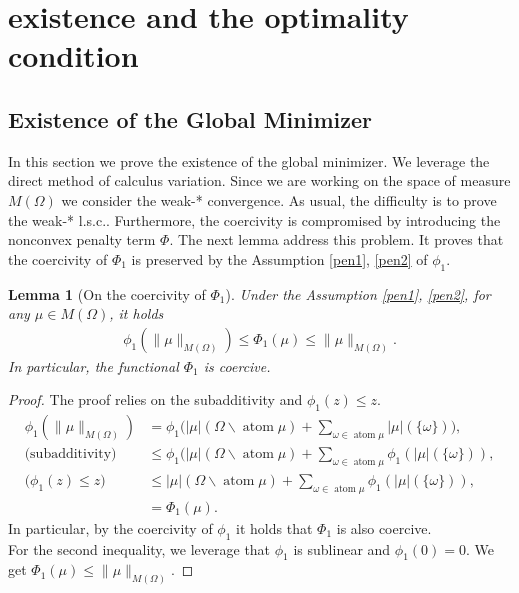 \documentclass[12pt,fleqn]{amsart}
\newtheorem{lemma}[theorem]{Lemma}
\theoremstyle{definition}
\DeclareMathOperator*{\atom}{atom}
\begin{document}
\section{existence and the optimality condition}
\subsection{Existence of the Global Minimizer}
In this section we prove the existence of the global minimizer. 
We leverage the direct method of calculus variation. 
Since we are working on the space of measure $M(\Omega)$ we consider the weak-* convergence. 
As usual, the difficulty is to prove the weak-* l.s.c.. 
Furthermore, the coercivity is compromised by introducing the nonconvex penalty term $\Phi$. 
The next lemma address this problem. 
It proves that the coercivity of $\Phi_1$ is preserved by the Assumption \ref{pen1}, \ref{pen2} of $\phi_1$.  

\begin{lemma}[On the coercivity of $\Phi_1$] \label{envolop}
Under the Assumption \ref{pen1}, \ref{pen2}, for any $\mu \in M(\Omega)$, it holds
\begin{align*}
	\phi_1(\|\mu\|_{M(\Omega)}) \le \Phi_1(\mu) \le \|\mu\|_{M(\Omega)}. 
\end{align*}
In particular, the functional $\Phi_1$ is coercive. 
\end{lemma}
\begin{proof}
The proof relies on the subadditivity and $\phi_1(z) \le z$.
\begin{align*}
	\phi_1(\|\mu\|_{M(\Omega)}) &= \phi_1 \bigg(|\mu|(\Omega \backslash \atom \mu) + \sum_{\omega \in \atom \mu } |\mu|(\{\omega\}) \bigg),\\
	(\text{subadditivity) }
	& \le \phi_1(|\mu|(\Omega\backslash \atom \mu) + \sum_{\omega \in \atom \mu } \phi_1(|\mu|(\{\omega\})), \\
	\bigg(\phi_1(z) \le z\bigg)\quad
	& \le |\mu|(\Omega\backslash \atom \mu) + \sum_{\omega \in  \atom \mu} \phi_1(|\mu|(\{\omega\})),\\
	& = \Phi_1(\mu).
\end{align*}
In particular, by the coercivity of $\phi_1$ it holds that $\Phi_1$ is also coercive. \\
For the second inequality, we leverage that $\phi_1$ is  sublinear and $\phi_1(0)= 0$. We get $\Phi_1(\mu) \le \|\mu\|_{M(\Omega)}$.  
\end{proof}
\end{document}
